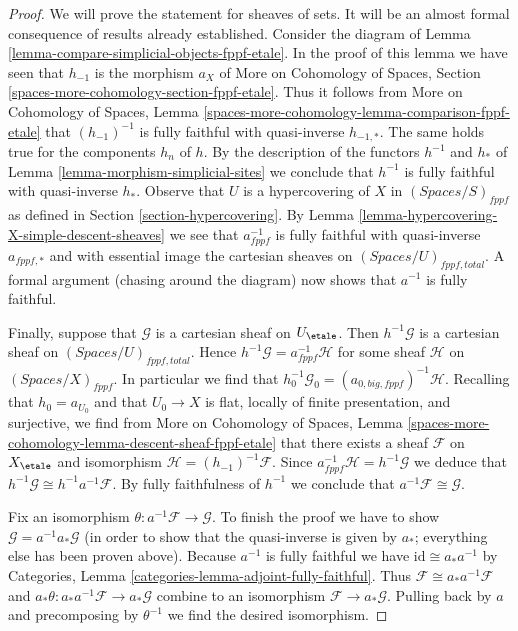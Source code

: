 \begin{proof}
We will prove the statement for sheaves of sets. It will be an
almost formal consequence of results already established.
Consider the diagram of
Lemma \ref{lemma-compare-simplicial-objects-fppf-etale}.
In the proof of this lemma we have seen that
$h_{-1}$ is the morphism $a_X$ of
More on Cohomology of Spaces, Section
\ref{spaces-more-cohomology-section-fppf-etale}.
Thus it follows from
More on Cohomology of Spaces, Lemma
\ref{spaces-more-cohomology-lemma-comparison-fppf-etale}
that $(h_{-1})^{-1}$ is fully faithful with quasi-inverse $h_{-1, *}$.
The same holds true for the components $h_n$ of $h$.
By the description of the functors $h^{-1}$ and $h_*$ of
Lemma \ref{lemma-morphism-simplicial-sites}
we conclude that $h^{-1}$ is fully faithful with quasi-inverse $h_*$.
Observe that $U$ is a hypercovering of $X$ in $(\textit{Spaces}/S)_{fppf}$
as defined in Section \ref{section-hypercovering}.
By Lemma \ref{lemma-hypercovering-X-simple-descent-sheaves}
we see that $a_{fppf}^{-1}$ is fully faithful with quasi-inverse
$a_{fppf, *}$ and with essential image the cartesian sheaves
on $(\textit{Spaces}/U)_{fppf, total}$.
A formal argument (chasing around the diagram) now shows that
$a^{-1}$ is fully faithful.

\medskip\noindent
Finally, suppose that $\mathcal{G}$ is a cartesian sheaf on $U_\etale$.
Then $h^{-1}\mathcal{G}$ is a cartesian sheaf on
$(\textit{Spaces}/U)_{fppf, total}$. Hence
$h^{-1}\mathcal{G} = a_{fppf}^{-1}\mathcal{H}$ for some sheaf
$\mathcal{H}$ on $(\textit{Spaces}/X)_{fppf}$.
In particular we find that
$h_0^{-1}\mathcal{G}_0 = (a_{0, big, fppf})^{-1}\mathcal{H}$.
Recalling that $h_0 = a_{U_0}$ and that $U_0 \to X$ is
flat, locally of finite presentation, and surjective, we
find from More on Cohomology of Spaces,
Lemma \ref{spaces-more-cohomology-lemma-descent-sheaf-fppf-etale}
that there exists a sheaf $\mathcal{F}$ on $X_\etale$ and isomorphism
$\mathcal{H} = (h_{-1})^{-1}\mathcal{F}$.
Since $a_{fppf}^{-1}\mathcal{H} = h^{-1}\mathcal{G}$
we deduce that $h^{-1}\mathcal{G} \cong h^{-1}a^{-1}\mathcal{F}$.
By fully faithfulness of $h^{-1}$ we conclude that
$a^{-1}\mathcal{F} \cong \mathcal{G}$.

\medskip\noindent
Fix an isomorphism $\theta : a^{-1}\mathcal{F} \to \mathcal{G}$.
To finish the proof we have to show $\mathcal{G} = a^{-1}a_*\mathcal{G}$
(in order to show that the quasi-inverse is given by $a_*$; everything
else has been proven above).
Because $a^{-1}$ is fully faithful we have $\text{id} \cong a_*a^{-1}$ by
Categories, Lemma \ref{categories-lemma-adjoint-fully-faithful}.
Thus $\mathcal{F} \cong a_*a^{-1}\mathcal{F}$ and
$a_*\theta : a_*a^{-1}\mathcal{F} \to a_*\mathcal{G}$
combine to an isomorphism $\mathcal{F} \to a_*\mathcal{G}$.
Pulling back by $a$ and precomposing by $\theta^{-1}$
we find the desired isomorphism.
\end{proof}

